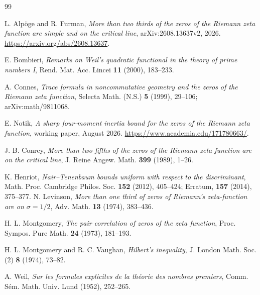 \documentclass[UTF8,11pt,a4paper]{ctexart}
\theoremstyle{definition}
\theoremstyle{remark}
\begin{document}
\begin{thebibliography}{99}

L. Alpöge and R. Furman,
\emph{More than two thirds of the zeros of the Riemann zeta function are
simple and on the critical line},
arXiv:2608.13637v2, 2026.
\url{https://arxiv.org/abs/2608.13637}.

E. Bombieri,
\emph{Remarks on Weil's quadratic functional in the theory of prime numbers I},
Rend. Mat. Acc. Lincei \textbf{11} (2000), 183--233.

A. Connes,
\emph{Trace formula in noncommutative geometry and the zeros of the
Riemann zeta function},
Selecta Math. (N.S.) \textbf{5} (1999), 29--106;
arXiv:math/9811068.

E. Notik,
\emph{A sharp four-moment inertia bound for the zeros of the Riemann
zeta function},
working paper, August 2026.
\url{https://www.academia.edu/171780663/}.

J. B. Conrey,
\emph{More than two fifths of the zeros of the Riemann zeta function are on
the critical line},
J. Reine Angew. Math. \textbf{399} (1989), 1--26.

K. Henriot,
\emph{Nair--Tenenbaum bounds uniform with respect to the discriminant},
Math. Proc. Cambridge Philos. Soc. \textbf{152} (2012), 405--424;
Erratum, \textbf{157} (2014), 375--377.
N. Levinson,
\emph{More than one third of zeros of Riemann's zeta-function are on
$\sigma=1/2$},
Adv. Math. \textbf{13} (1974), 383--436.

H. L. Montgomery,
\emph{The pair correlation of zeros of the zeta function},
Proc. Sympos. Pure Math. \textbf{24} (1973), 181--193.

H. L. Montgomery and R. C. Vaughan,
\emph{Hilbert's inequality},
J. London Math. Soc. (2) \textbf{8} (1974), 73--82.

A. Weil,
\emph{Sur les formules explicites de la théorie des nombres premiers},
Comm. Sém. Math. Univ. Lund (1952), 252--265.

\end{thebibliography}
\end{document}
